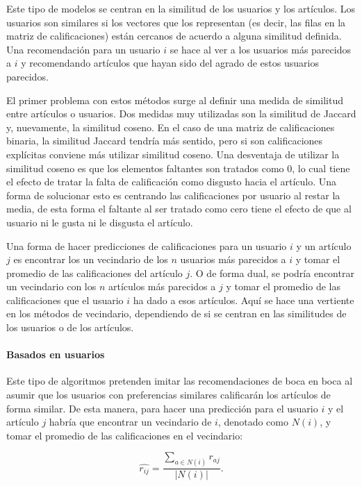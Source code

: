 Este tipo de modelos se centran en la similitud de los usuarios y los artículos. Los usuarios son similares si los vectores que los representan (es decir, las filas en la matriz de calificaciones) están cercanos de acuerdo a alguna similitud definida. Una recomendación para un usuario $i$ se hace al ver a los usuarios más parecidos a $i$ y recomendando artículos que hayan sido del agrado de estos usuarios parecidos.

El primer problema con estos métodos surge al definir una medida de similitud entre artículos o usuarios. Dos medidas muy utilizadas son la similitud de Jaccard y, nuevamente, la similitud coseno. En el caso de una matriz de calificaciones binaria, la similitud Jaccard tendría más sentido, pero si son calificaciones explícitas conviene más utilizar similitud coseno. Una desventaja de utilizar la similitud coseno es que los elementos faltantes son tratados como $0$, lo cual tiene el efecto de tratar la falta de calificación como disgusto hacia el artículo. Una forma de solucionar esto es centrando las calificaciones por usuario al restar la media, de esta forma el faltante al ser tratado como cero tiene el efecto de que al usuario ni le gusta ni le disgusta el artículo.

Una forma de hacer predicciones de calificaciones para un usuario $i$ y un artículo $j$ es encontrar los un vecindario de los $n$ usuarios más parecidos a $i$ y tomar el promedio de las calificaciones del artículo $j$. O de forma dual, se podría encontrar un vecindario con los $n$ artículos más parecidos a $j$ y tomar el promedio de las calificaciones que el usuario $i$ ha dado a esos artículos. Aquí se hace una vertiente en los métodos de vecindario, dependiendo de si se centran en las similitudes de los usuarios o de los artículos.

\paragraph{Basados en usuarios}

Este tipo de algoritmos pretenden imitar las recomendaciones de boca en boca al asumir que los usuarios con preferencias similares calificarán los artículos de forma similar. De esta manera, para hacer una predicción para el usuario $i$ y el artículo $j$ habría que encontrar un vecindario de $i$, denotado como $N(i)$, y tomar el promedio de las calificaciones en el vecindario:

\begin{equation}\label{eq:predic_modelo_usuario_sencillo}
 \hat{r_{ij}} = \frac{\sum_{a \in N(i)} r_{aj}}{\vert N(i) \vert}.
\end{equation}

